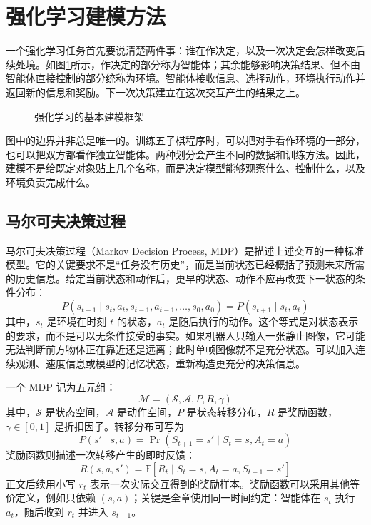 \documentclass[UTF8,a4paper,zihao=-4,oneside,openany]{ctexbook}
\begin{document}
\section{强化学习建模方法}

一个强化学习任务首先要说清楚两件事：谁在作决定，以及一次决定会怎样改变后续处境。如图\ref{fig:framework}所示，作决定的部分称为智能体；其余能够影响决策结果、但不由智能体直接控制的部分统称为环境。智能体接收信息、选择动作，环境执行动作并返回新的信息和奖励。下一次决策建立在这次交互产生的结果之上。

\begin{figure}[htbp]
  \centering
  \caption{强化学习的基本建模框架}
  \label{fig:framework}
\end{figure}

图中的边界并非总是唯一的。训练五子棋程序时，可以把对手看作环境的一部分，也可以把双方都看作独立智能体。两种划分会产生不同的数据和训练方法。因此，建模不是给既定对象贴上几个名称，而是决定模型能够观察什么、控制什么，以及环境负责完成什么。

\subsection{马尔可夫决策过程}

马尔可夫决策过程（Markov Decision Process, MDP）是描述上述交互的一种标准模型。它的关键要求不是“任务没有历史”，而是当前状态已经概括了预测未来所需的历史信息。给定当前状态和动作后，更早的状态、动作不应再改变下一状态的条件分布：
\begin{equation}
P(s_{t+1} \mid s_t, a_t, s_{t-1}, a_{t-1}, \ldots, s_0, a_0)
=
P(s_{t+1} \mid s_t, a_t)
\end{equation}
其中，\(s_t\) 是环境在时刻 \(t\) 的状态，\(a_t\) 是随后执行的动作。这个等式是对状态表示的要求，而不是可以无条件接受的事实。如果机器人只输入一张静止图像，它可能无法判断前方物体正在靠近还是远离；此时单帧图像就不是充分状态。可以加入连续观测、速度信息或模型的记忆状态，重新构造更充分的决策信息。

一个 MDP 记为五元组：
\begin{equation}
\mathcal{M} = (\mathcal{S}, \mathcal{A}, P, R, \gamma)
\end{equation}
其中，\(\mathcal{S}\) 是状态空间，\(\mathcal{A}\) 是动作空间，\(P\) 是状态转移分布，\(R\) 是奖励函数，\(\gamma\in[0,1]\) 是折扣因子。转移分布可写为
\begin{equation}
P(s'\mid s,a)=\Pr(S_{t+1}=s'\mid S_t=s,A_t=a)
\end{equation}
奖励函数则描述一次转移产生的即时反馈：
\begin{equation}
R(s,a,s')=\mathbb{E}[R_t\mid S_t=s,A_t=a,S_{t+1}=s']
\end{equation}
正文后续用小写 \(r_t\) 表示一次实际交互得到的奖励样本。奖励函数可以采用其他等价定义，例如只依赖 \((s,a)\)；关键是全章使用同一时间约定：智能体在 \(s_t\) 执行 \(a_t\)，随后收到 \(r_t\) 并进入 \(s_{t+1}\)。
\end{document}
